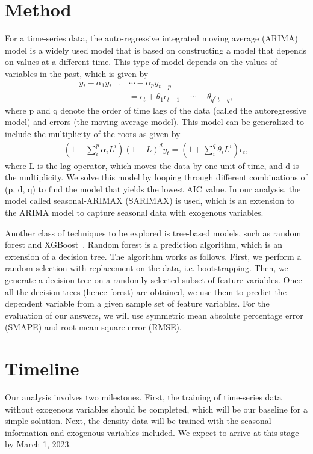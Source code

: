 \documentclass[prl,aps,superscriptaddress,twocolumn,10pt,nolongbibliography]{revtex4-2}
\begin{document}
\section{Method}
For a time-series data, the auto-regressive integrated moving average (ARIMA) model is a widely used model that is based on constructing a model that depends on values at a different time. 
This type of model depends on the values of variables in the past, which is given by 
\begin{align}
y_t - \alpha_1 y_{t-1} &\cdots - \alpha_p y_{t-p} \nonumber \\
&= \epsilon_t + \theta_1 \epsilon_{t-1} + \cdots + \theta_q \epsilon_{t-q},
\end{align}
where p and q denote the order of time lags of the data (called the autoregressive model) and errors (the moving-average model). 
This model can be generalized to include the multiplicity of the roots as given by 
\begin{align}
(1 - \sum_i^p \alpha_i L^i) (1 - L)^d y_t = (1 + \sum_i^q \theta_i L^i) \epsilon_t,
\end{align}
where L is the lag operator, which moves the data by one unit of time, and d is the multiplicity. We solve this model by looping through different combinations of (p, d, q) to find the model that yields the lowest AIC value. 
In our analysis, the model called seasonal-ARIMAX (SARIMAX) is used, which is an extension to the ARIMA model to capture seasonal data with exogenous variables.

Another class of techniques to be explored is tree-based models, such as random forest and XGBoost~\cite{chen2016xgboost}.
Random forest is a prediction algorithm, which is an extension of a decision tree. 
The algorithm works as follows. First, we perform a random selection with replacement on the data, i.e. bootstrapping. 
Then, we generate a decision tree on a randomly selected subset of feature variables. 
Once all the decision trees (hence forest) are obtained, we use them to predict the dependent variable from a given sample set of feature variables.
For the evaluation of our answers, we will use symmetric mean absolute percentage error (SMAPE) and root-mean-square error (RMSE).

\section{Timeline}
Our analysis involves two milestones. 
First, the training of time-series data without exogenous variables should be completed, which will be our baseline for a simple solution. 
Next, the density data will be trained with the seasonal information and exogenous variables included. 
We expect to arrive at this stage by March 1, 2023.
\end{document}
